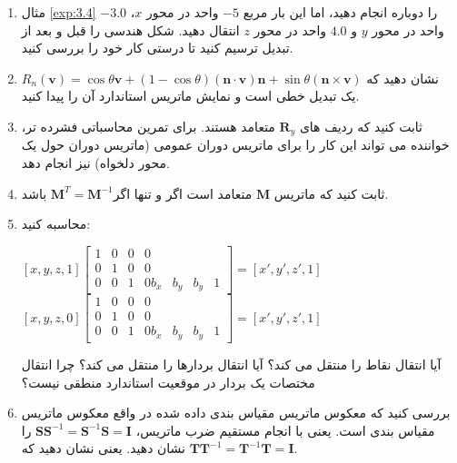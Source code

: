 {\begin{spacing}{1.5}
\begin{enumerate}[label=\textbf{\arabic*}.]
            \item {مثال \ref{exp:3.4} را دوباره انجام دهید، اما این بار مربع $-5$ واحد در محور $x$، $-3.0$ واحد در محور $y$ و $4.0$ واحد در محور $z$ انتقال دهید.
            شکل هندسی را قبل و بعد از تبدیل ترسیم کنید تا درستی کار خود را بررسی کنید.}

            \item {نشان دهید که $R_{n}(\textbf{v})=\cos\theta\textbf{v}+(1-\cos\theta)(\textbf{n}\cdot\textbf{v})\textbf{n}+\sin\theta(\textbf{n}\times\textbf{v})$ یک تبدیل خطی است و نمایش ماتریس استاندارد آن را پیدا کنید.}

            \item {ثابت کنید که ردیف های $\textbf{R}_{y}$ متعامد هستند. برای تمرین محاسباتی فشرده تر، خواننده می تواند این کار را برای ماتریس دوران عمومی (ماتریس دوران حول یک محور دلخواه) نیز انجام دهد.}

            \item {ثابت کنید که ماتریس $\textbf{M}$ متعامد است اگر و تنها اگر$\textbf{M}^{T}=\textbf{M}^{-1}$ باشد.}

            \item { محاسبه کنید:
                \begin{center}
                    $[x, y, z, 1]\begin{bmatrix}
                                     1 & 0 & 0 & 0 \\
                                     0 & 1 & 0 & 0 \\
                                     0 & 0 & 1 & 0
                                     b_{x} & b_{y} & b_{y} & 1
                    \end{bmatrix}=[x\prime, y\prime, z\prime,1]$ \hspace{5 mm}
                    $[x, y, z, 0]\begin{bmatrix}
                                     1 & 0 & 0 & 0 \\
                                     0 & 1 & 0 & 0 \\
                                     0 & 0 & 1 & 0
                                     b_{x} & b_{y} & b_{y} & 1
                    \end{bmatrix}=[x\prime, y\prime, z\prime,1]$
                \end{center}
                آیا انتقال نقاط را منتقل می کند؟ آیا انتقال بردارها را منتقل می کند؟ چرا انتقال مختصات یک بردار در موقعیت استاندارد منطقی نیست؟
            }

            \item {بررسی کنید که معکوس ماتریس مقیاس بندی داده شده در واقع معکوس ماتریس مقیاس بندی است.
            یعنی با انجام مستقیم ضرب ماتریس، $\textbf{SS}^{-1}=\textbf{S}^{-1}\textbf{S}=\textbf{I}$ را نشان دهید. یعنی نشان دهید که $\textbf{TT}^{-1}=\textbf{T}^{-1}\textbf{T}=\textbf{I}$.}


\end{enumerate}
\end{spacing}}
